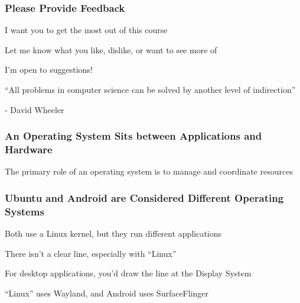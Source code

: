   \begin{frame}
    \frametitle{Please Provide Feedback}

    I want you to get the most out of this course

    \vspace{2em}

    Let me know what you like, dislike, or want to see more of

    \vspace{2em}

    I'm open to suggestions!
  \end{frame}
  
  \begin{frame}
    \vfill
    ``All problems in computer science can be solved by another level of
    indirection''

    \begin{flushright}
      - David Wheeler
    \end{flushright}
    \vfill
  \end{frame}

  \begin{frame}
    \frametitle{An Operating System Sits between Applications and Hardware}

    \centering

    \begin{flushright}
      The primary role of an operating system is to manage and coordinate resources
    \end{flushright}
  \end{frame}

  \begin{frame}
    \frametitle{Ubuntu and Android are Considered Different Operating Systems}

    Both use a Linux kernel, but they run different applications

    \vspace{2em}

    There isn't a clear line, especially with ``Linux''

    \vspace{4em}

    For desktop applications, you'd draw the line at the Display System

    \vspace{2em}

    ``Linux'' uses Wayland, and Android uses SurfaceFlinger
  \end{frame}

